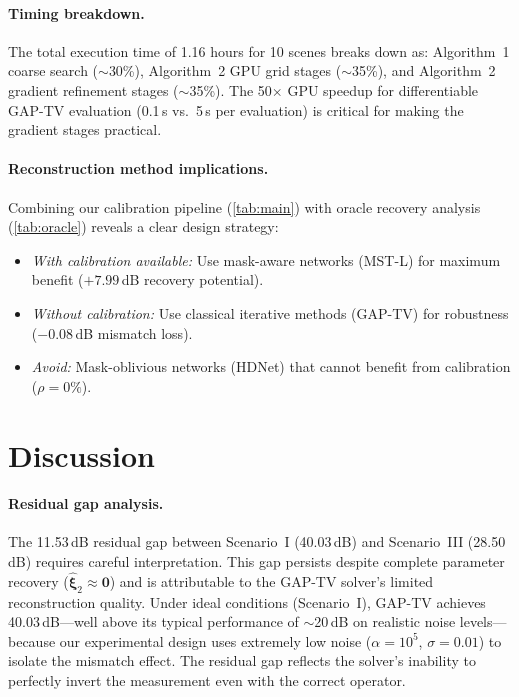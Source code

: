 \documentclass[runningheads]{llncs}
\begin{document}
\paragraph{Timing breakdown.}
The total execution time of 1.16 hours for 10 scenes breaks down as: Algorithm~1 coarse search ($\sim$30\%), Algorithm~2 GPU grid stages ($\sim$35\%), and Algorithm~2 gradient refinement stages ($\sim$35\%).
The 50$\times$ GPU speedup for differentiable GAP-TV evaluation (0.1\,s vs.\ 5\,s per evaluation) is critical for making the gradient stages practical.

\paragraph{Reconstruction method implications.}
Combining our calibration pipeline (\cref{tab:main}) with oracle recovery analysis (\cref{tab:oracle}) reveals a clear design strategy:
\begin{itemize}
    \item \textit{With calibration available:} Use mask-aware networks (MST-L) for maximum benefit ($+7.99$\,dB recovery potential).
    \item \textit{Without calibration:} Use classical iterative methods (GAP-TV) for robustness ($-0.08$\,dB mismatch loss).
    \item \textit{Avoid:} Mask-oblivious networks (HDNet) that cannot benefit from calibration ($\rho = 0\%$).
\end{itemize}

\section{Discussion}
\label{sec:discussion}

\paragraph{Residual gap analysis.}
The 11.53\,dB residual gap between Scenario~I (40.03\,dB) and Scenario~III (28.50\,dB) requires careful interpretation.
This gap persists despite complete parameter recovery ($\hat{\boldsymbol{\xi}}_2 \approx \boldsymbol{0}$) and is attributable to the GAP-TV solver's limited reconstruction quality.
Under ideal conditions (Scenario~I), GAP-TV achieves 40.03\,dB---well above its typical performance of $\sim$20\,dB on realistic noise levels---because our experimental design uses extremely low noise ($\alpha = 10^5$, $\sigma = 0.01$) to isolate the mismatch effect.
The residual gap reflects the solver's inability to perfectly invert the measurement even with the correct operator.
\end{document}
